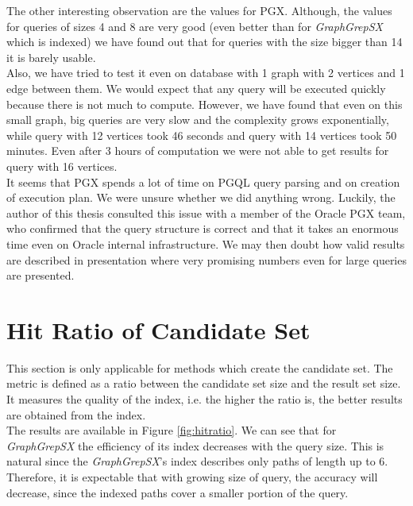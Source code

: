 The other interesting observation are the values for PGX. Although, the values for queries of sizes 4 and 8 are very good (even better than for \textit{GraphGrepSX} which is indexed) we have found out that for queries with the size bigger than 14 it is barely usable.\\

Also, we have tried to test it even on database with 1 graph with 2 vertices and 1 edge between them. We would expect that any query will be executed quickly because there is not much to compute. However, we have found that even on this small graph, big queries are very slow and the complexity grows exponentially, while query with 12 vertices took 46 seconds and query with 14 vertices took 50 minutes. Even after 3 hours of computation we were not able to get results for query with 16 vertices.\\

It seems that PGX spends a lot of time on PGQL query parsing and on creation of execution plan. We were unsure whether we did anything wrong. Luckily, the author of this thesis consulted this issue with a member of the Oracle PGX team, who confirmed that the query structure is correct and that it takes an enormous time even on Oracle internal infrastructure. We may then doubt how valid results are described in presentation \cite{pgx-neo4j} where very promising numbers even for large queries are presented.

\section{Hit Ratio of Candidate Set}
This section is only applicable for methods which create the candidate set. The metric is defined as a ratio between the candidate set size and the result set size. It measures the quality of the index, i.e. the higher the ratio is, the better results are obtained from the index.\\

The results are available in Figure \ref{fig:hitratio}. We can see that for \textit{GraphGrepSX} the efficiency of its index decreases with the query size. This is natural since the \textit{GraphGrepSX}'s index describes only paths of length up to 6. Therefore, it is expectable that with growing size of query, the accuracy will decrease, since the indexed paths cover a smaller portion of the query.\\

